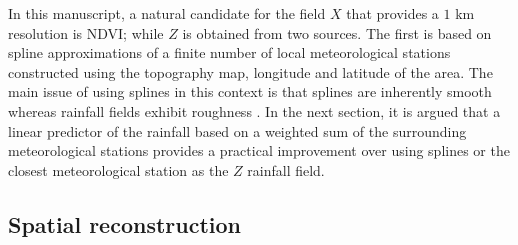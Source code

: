 {In this manuscript, a natural candidate for  the field  $X$ that provides a $1$ km resolution is NDVI; while $Z$ is obtained from two sources. The first is based on spline approximations of a finite number of local meteorological stations constructed using the topography map, longitude and latitude  of the area. The main issue of using splines in this context is that splines are inherently smooth whereas rainfall fields exhibit  roughness \citep{Kedem-Long_87,Lin_78}. In the next section, it is argued that a linear predictor of the rainfall  based on a weighted sum of the surrounding meteorological stations  provides a practical improvement over using splines or the closest meteorological station as the $Z$ rainfall field. 


\subsection{Spatial reconstruction}

}
